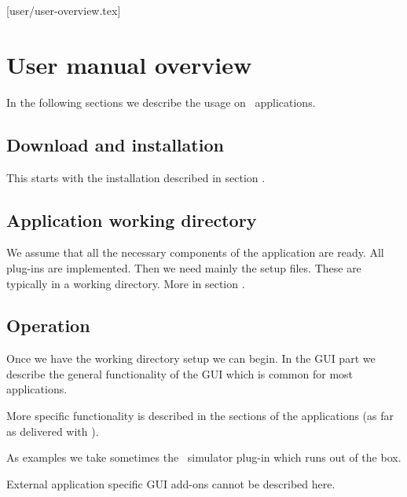 [user/user-overview.tex]
\section{User manual overview}
In the following sections we describe the usage on \dabc\ applications.
\subsection{Download and installation}
This starts with the installation described in section .
\subsection{Application working directory}
We assume that all the necessary components of the application are ready.
All plug-ins are implemented. Then we need mainly the setup files.
These are typically in a working directory. More in section .
\subsection{Operation}
Once we have the working directory setup we can begin.
In the GUI part we describe the general functionality of the GUI
which is common for most applications.

More specific functionality is described in the sections of the applications
(as far as delivered with \dabc).

As examples we take sometimes the \dabc\ simulator plug-in which runs out of the box.

External application specific GUI add-ons cannot be described here.

